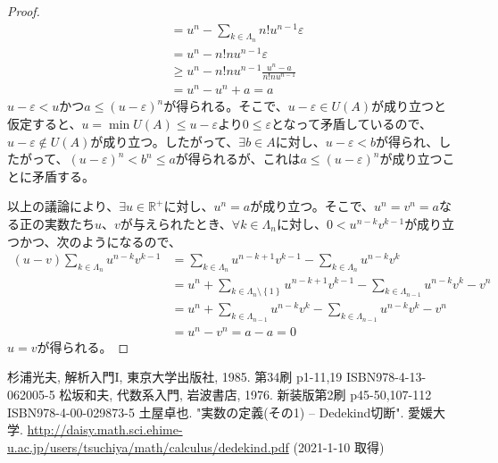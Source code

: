 \documentclass[dvipdfmx]{jsarticle}
\begin{document}
\begin{proof}
\begin{align*}
&= u^{n} - \sum_{k \in \varLambda_{n} } {n!u^{n - 1}\varepsilon}\\ 
&= u^{n} - n!nu^{n - 1}\varepsilon\\ 
&\geq u^{n} - n!nu^{n - 1}\frac{u^{n} - a}{n!nu^{n - 1}}\\ 
&= u^{n} - u^{n} + a = a
\end{align*}
$u - \varepsilon < u$かつ$a \leq (u - \varepsilon)^{n}$が得られる。そこで、$u - \varepsilon \in U(A)$が成り立つと仮定すると、$u = \min{U(A)} \leq u - \varepsilon$より$0 \leq \varepsilon$となって矛盾しているので、$u - \varepsilon \notin U(A)$が成り立つ。したがって、$\exists b \in A$に対し、$u - \varepsilon < b$が得られ、したがって、$(u - \varepsilon)^{n} < b^{n} \leq a$が得られるが、これは$a \leq (u - \varepsilon)^{n}$が成り立つことに矛盾する。\par
以上の議論により、$\exists u \in \mathbb{R}^{+}$に対し、$u^{n} = a$が成り立つ。そこで、$u^{n} = v^{n} = a$なる正の実数たち$u$、$v$が与えられたとき、$\forall k \in \varLambda_{n}$に対し、$0 < u^{n - k}v^{k - 1}$が成り立つかつ、次のようになるので、
\begin{align*}
(u - v)\sum_{k \in \varLambda_{n}} {u^{n - k}v^{k - 1}} &= \sum_{k \in \varLambda_{n}} {u^{n - k + 1}v^{k - 1}} - \sum_{k \in \varLambda_{n}} {u^{n - k}v^{k}}\\ 
&= u^{n} + \sum_{k \in \varLambda_{n} \setminus \left\{ 1 \right\}} {u^{n - k + 1}v^{k - 1}} - \sum_{k \in \varLambda_{n - 1}} {u^{n - k}v^{k}} - v^{n}\\ 
&= u^{n} + \sum_{k \in \varLambda_{n - 1}} {u^{n - k}v^{k}} - \sum_{k \in \varLambda_{n - 1}} {u^{n - k}v^{k}} - v^{n}\\ 
&= u^{n} - v^{n} = a - a = 0
\end{align*}
$u = v$が得られる。
\end{proof}
\begin{thebibliography}{50}
  杉浦光夫, 解析入門I, 東京大学出版社, 1985. 第34刷 p1-11,19 ISBN978-4-13-062005-5
  松坂和夫, 代数系入門, 岩波書店, 1976. 新装版第2刷 p45-50,107-112 ISBN978-4-00-029873-5
  土屋卓也. "実数の定義(その1) -- Dedekind切断". 愛媛大学. \url{http://daisy.math.sci.ehime-u.ac.jp/users/tsuchiya/math/calculus/dedekind.pdf} (2021-1-10 取得)
\end{thebibliography}
\end{document}
